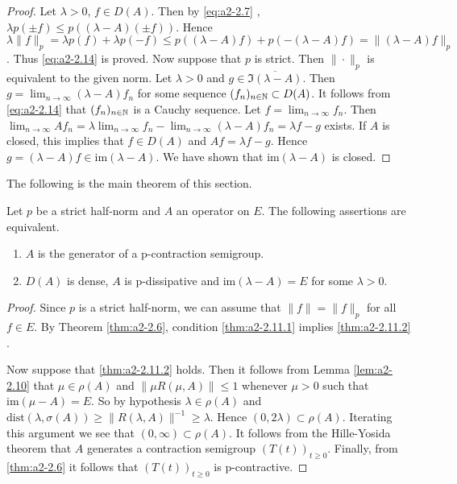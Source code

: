 \begin{proof}
Let $\lambda > 0$, $f \in D(A)$.
Then by \eqref{eq:a2-2.7}  
, $\lambda p(\pm f) \leq p((\lambda - A)(\pm f))$.
Hence $\lambda\|f\|_{p} = \lambda p(f) + \lambda p(-f) \leq p((\lambda - A)f) + p(-(\lambda-A)f) = \|(\lambda-A)f\|_{p}$.
Thus \eqref{eq:a2-2.14}   
is proved.
Now suppose that $p$ is strict.
Then $\|\cdot\|_{p}$ is equivalent to the given norm.
Let $\lambda > 0$ and $g \in \overline{\Im(\lambda - A)}$.
Then $g = \lim_{n\to\infty} (\lambda - A)f_{n}$ for some sequence $(f_{n})_{n \in \mathbb{N}} \subset D(A)$.
It follows from \eqref{eq:a2-2.14}  
that $(f_{n})_{n\in\mathbb{N}}$ is a Cauchy sequence.
Let $f = \lim_{n\to\infty} f_{n}$.
Then 
$\lim_{n\to\infty} Af_{n} 
= \lambda\lim_{n\to\infty} f_{n} - \lim_{n\to\infty} (\lambda - A)f_{n} = \lambda f - g$ 
exists.
If $A$ is closed, this implies that $f \in D(A)$ and $Af = \lambda f - g$.
Hence $g = (\lambda - A)f \in \text{im}(\lambda - A)$.
We have shown that $\text{im}(\lambda - A)$ is closed.
\end{proof}

The following is the main theorem of this section.

\begin{theorem}\label{thm:a2-2.11}
Let $p$ be a strict half-norm and $A$ an operator on $E$.
The following assertions are equivalent.
\begin{enumerate}[\upshape (a)]
\item \label{thm:a2-2.11.1}
$A$ is the generator of a p-contraction semigroup.
\item \label{thm:a2-2.11.2}
$D(A)$ is dense, $A$ is p-dissipative and $\text{im}(\lambda - A) = E$ for some $\lambda > 0$.
\end{enumerate}
\end{theorem}
\begin{proof}
Since $p$ is a strict half-norm, we can assume that $\|f\| = \|f\|_{p}$ for all $f \in E$.
By Theorem \ref{thm:a2-2.6}, condition \ref{thm:a2-2.11.1} implies \ref{thm:a2-2.11.2} . 

Now suppose that \ref{thm:a2-2.11.2}   holds.
Then it follows from Lemma \ref{lem:a2-2.10}   
that $\mu \in \rho(A)$ and $\|\mu R(\mu,A)\| \leq 1$ whenever $\mu > 0$ such that $\text{im}(\mu-A) = E$.
So by hypothesis $\lambda \in \rho(A)$ and 
$\text{dist}(\lambda,\sigma(A)) \geq \|R(\lambda,A)\|^{-1} \geq \lambda$.
Hence $(0,2\lambda) \subset \rho(A)$.
Iterating this argument we see that $(0,\infty) \subset \rho(A)$.
It follows from the Hille-Yosida theorem that $A$ generates a contraction semigroup $(T(t))_{t\geq 0}$.
Finally, from \ref{thm:a2-2.6} 
it follows that $(T(t))_{t\geq 0}$ is p-contractive.
\end{proof}

